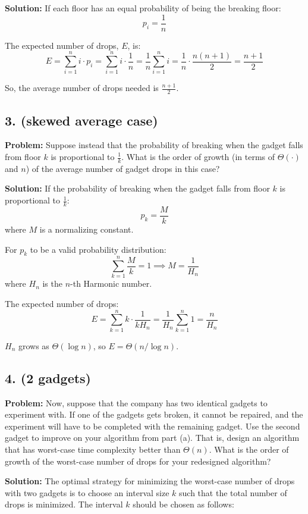 \documentclass{article}
\begin{document}
\textbf{Solution:} If each floor has an equal probability of being the breaking floor:
\[
p_i = \frac{1}{n}
\]

The expected number of drops, \( E \), is:
\[
E = \sum_{i=1}^n i \cdot p_i = \sum_{i=1}^n i \cdot \frac{1}{n} = \frac{1}{n} \sum_{i=1}^n i = \frac{1}{n} \cdot \frac{n(n+1)}{2} = \frac{n+1}{2}
\]

So, the average number of drops needed is \( \frac{n+1}{2} \).

\subsection*{3. (skewed average case)}
\textbf{Problem:} Suppose instead that the probability of breaking when the gadget falls from floor \( k \) is proportional to \( \frac{1}{k} \). What is the order of growth (in terms of \( \Theta(\cdot) \) and \( n \)) of the average number of gadget drops in this case?

\textbf{Solution:}
If the probability of breaking when the gadget falls from floor \( k \) is proportional to \( \frac{1}{k} \):
\[
p_k = \frac{M}{k}
\]
where \( M \) is a normalizing constant.

For \( p_k \) to be a valid probability distribution:
\[
\sum_{k=1}^n \frac{M}{k} = 1 \implies M = \frac{1}{H_n}
\]
where \( H_n \) is the \( n \)-th Harmonic number.

The expected number of drops:
\[
E = \sum_{k=1}^n k \cdot \frac{1}{kH_n} = \frac{1}{H_n} \sum_{k=1}^n 1 = \frac{n}{H_n}
\]

\( H_n \) grows as \( \Theta(\log n) \), so \( E = \Theta(n / \log n) \).

\subsection*{4. (2 gadgets)}
\textbf{Problem:} Now, suppose that the company has two identical gadgets to experiment with. If one of the gadgets gets broken, it cannot be repaired, and the experiment will have to be completed with the remaining gadget. Use the second gadget to improve on your algorithm from part (a). That is, design an algorithm that has worst-case time complexity better than \( \Theta(n) \). What is the order of growth of the worst-case number of drops for your redesigned algorithm?

\textbf{Solution:} The optimal strategy for minimizing the worst-case number of drops with two gadgets is to choose an interval size \( k \) such that the total number of drops is minimized. The interval \( k \) should be chosen as follows:
\end{document}
